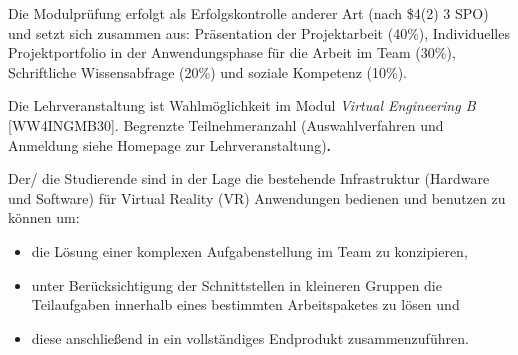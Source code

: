 \begin{course}

\setdoclanguagegerman
{}



\coursehead


\label{cour_13209.dp_997}


\begin{styleenv}
\begin{assessment}
Die Modulprüfung erfolgt als Erfolgskontrolle anderer Art (nach \$4(2) 3 SPO) und setzt sich zusammen aus: Präsentation der Projektarbeit (40\%), Individuelles Projektportfolio in der Anwendungsphase für die Arbeit im Team (30\%), Schriftliche Wissensabfrage (20\%) und soziale Kompetenz (10\%).

 
\end{assessment}

\begin{conditions}Die Lehrveranstaltung ist Wahlmöglichkeit im Modul\emph{ Virtual Engineering B }[WW4INGMB30]. Begrenzte Teilnehmeranzahl (Auswahlverfahren und Anmeldung siehe Homepage zur Lehrveranstaltung)\textbf{.}

\end{conditions}


\end{styleenv}

\begin{learningoutcomes}
Der/ die Studierende sind in der Lage die bestehende Infrastruktur (Hardware und Software) für Virtual Reality (VR) Anwendungen bedienen und benutzen zu können um:

 \begin{itemize}\item die Lösung einer komplexen Aufgabenstellung im Team zu konzipieren,  \item unter Berücksichtigung der Schnittstellen in kleineren Gruppen die Teilaufgaben innerhalb eines bestimmten Arbeitspaketes zu lösen und  \item diese anschließend in ein vollständiges Endprodukt zusammenzuführen.  \end{itemize}


\end{learningoutcomes}
\end{course}
